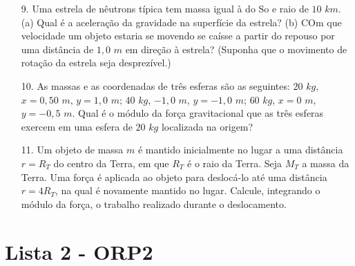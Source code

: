 \begin{itemize}
    \item[9.] \textbf{\cite{Halliday2009vol2}} Uma estrela de nêutrons típica tem massa igual à do So e raio de $10$ $km$. (a) Qual é a aceleração da gravidade na superfície da estrela? (b) COm que velocidade um objeto estaria se movendo se caísse a partir do repouso por uma distância de $1,0$ $m$ em direção à estrela? (Suponha que o movimento de rotação da estrela seja desprezível.)

    \item[10.] \textbf{\cite{Halliday2009vol2}} As massas e as coordenadas de três esferas são as seguintes: $20$ $kg$, $x = 0,50$ $m$, $y=1,0$ $m$; $40$ $kg$, $-1,0$ $m$, $y= -1,0$ $m$; $60$ $kg$, $x= 0$ $m$, $y= -0,5$ $m$. Qual é o módulo da força gravitacional que as três esferas exercem em uma esfera de $20$ $kg$ localizada na origem?

    \item[11.] \textbf{\cite{Halliday2009vol2}} Um objeto de massa $m$ é mantido inicialmente no lugar a uma distância $r=R_T$ do centro da Terra, em que $R_T$ é o raio da Terra. Seja $M_T$ a massa da Terra.  Uma força é aplicada ao objeto para deslocá-lo até uma distância $r=4R_T$, na qual é novamente mantido no lugar. Calcule, integrando o módulo da força, o trabalho realizado durante o deslocamento.

\end{itemize}
\newpage
\section{Lista 2 - ORP2} \label{ch:orp2l2}

